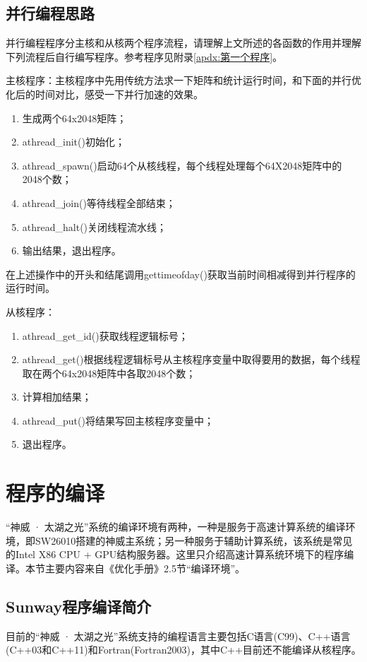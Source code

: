 \subsection{并行编程思路}\label{subsec:并行编程思路}
并行编程程序分主核和从核两个程序流程，请理解上文所述的各函数的作用并理解下列流程后自行编写程序。参考程序见附录\ref{apdx:第一个程序}。

主核程序：主核程序中先用传统方法求一下矩阵和统计运行时间，和下面的并行优化后的时间对比，感受一下并行加速的效果。
\begin{enumerate}
	\item 生成两个64x2048矩阵；
	\item athread\_init()初始化；
	\item athread\_spawn()启动64个从核线程，每个线程处理每个64X2048矩阵中的2048个数；
	\item athread\_join()等待线程全部结束；
	\item athread\_halt()关闭线程流水线；
	\item 输出结果，退出程序。
\end{enumerate}

在上述操作中的开头和结尾调用gettimeofday()获取当前时间相减得到并行程序的运行时间。

从核程序：
\begin{enumerate}
	\item athread\_get\_id()获取线程逻辑标号；
	\item athread\_get()根据线程逻辑标号从主核程序变量中取得要用的数据，每个线程取在两个64x2048矩阵中各取2048个数；
	\item 计算相加结果；
	\item athread\_put()将结果写回主核程序变量中；
	\item 退出程序。
\end{enumerate}

\section{程序的编译}
“神威 · 太湖之光”系统的编译环境有两种，一种是服务于高速计算系统的编译环境，即SW26010搭建的神威主系统；另一种服务于辅助计算系统，该系统是常见的Intel X86 CPU + GPU结构服务器。这里只介绍高速计算系统环境下的程序编译。本节主要内容来自《优化手册》2.5节“编译环境”。

\subsection{Sunway程序编译简介}
目前的“神威 · 太湖之光”系统支持的编程语言主要包括C语言(C99)、C++语言(C++03和C++11)和Fortran(Fortran2003)，其中C++目前还不能编译从核程序。

